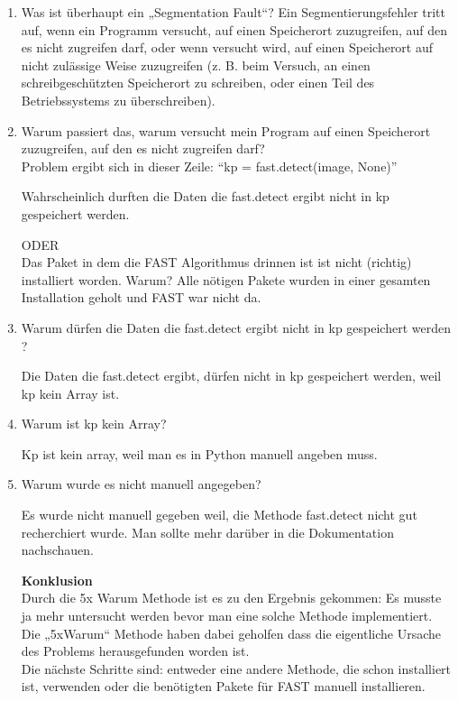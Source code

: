 \begin{enumerate}
	
	
	\item 	Was ist überhaupt ein „Segmentation Fault“? 
	Ein Segmentierungsfehler tritt auf, wenn ein Programm versucht, auf einen Speicherort zuzugreifen, auf den es nicht zugreifen darf, oder wenn versucht wird, auf einen Speicherort auf nicht zulässige Weise zuzugreifen (z. B. beim Versuch, an einen schreibgeschützten Speicherort zu schreiben, oder einen Teil des Betriebssystems zu überschreiben).\\
	\item 	Warum passiert das, warum versucht mein Program auf einen Speicherort zuzugreifen, auf den es nicht zugreifen darf?\\
	
	Problem ergibt sich in dieser Zeile: 
	“kp = fast.detect(image, None)”
	
	Wahrscheinlich durften die Daten die fast.detect ergibt nicht in kp gespeichert werden. 
	
	ODER\\
	
	Das Paket in dem die FAST Algorithmus drinnen ist ist nicht (richtig) installiert worden.
	Warum? Alle nötigen Pakete wurden in einer gesamten Installation geholt und FAST war nicht da. 
	
	\item	Warum dürfen die Daten die fast.detect ergibt nicht in kp gespeichert werden ? 
	
	Die Daten die fast.detect ergibt, dürfen nicht in kp gespeichert werden, weil kp kein Array ist. 
	
	\item	Warum ist kp kein Array? 
	
	Kp ist kein array, weil man es in Python  manuell angeben muss.
	
	\item Warum wurde es nicht manuell angegeben? 
	
	Es wurde nicht manuell gegeben weil, die Methode fast.detect nicht gut recherchiert wurde. Man sollte mehr darüber in die Dokumentation nachschauen.
	
\textbf{Konklusion}\\
Durch die 5x Warum Methode ist es zu den Ergebnis gekommen: Es musste ja mehr untersucht werden bevor man eine solche Methode implementiert. Die „5xWarum“ Methode haben dabei geholfen dass die eigentliche Ursache des Problems herausgefunden worden ist.\\
Die nächste Schritte sind: entweder eine andere Methode, die schon installiert ist, verwenden oder die benötigten Pakete für FAST manuell installieren. 
	
 
	
\end{enumerate}


